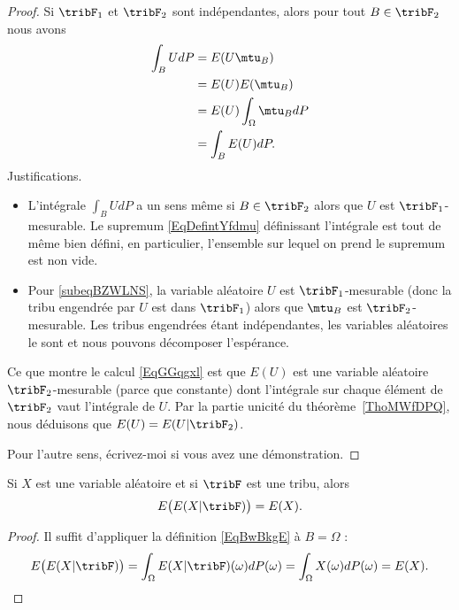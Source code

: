 \begin{proof}
	Si \( \tribF_1\) et \( \tribF_2\) sont indépendantes, alors pour tout \( B\in\tribF_2\) nous avons
	\begin{subequations}    \label{EqGGqgxl}
		\begin{align}
			\int_B UdP & =E(U\mtu_B)                                \\
			           & =E(U)E(\mtu_B)         \label{subeqBZWLNS} \\
			           & =E(U)\int_{\Omega}\mtu_BdP                 \\
			           & =\int_B E(U)dP.
		\end{align}
	\end{subequations}
	Justifications.
	\begin{itemize}
		\item L'intégrale \( \int_BUdP\) a un sens même si \( B\in\tribF_2\) alors que \( U\) est \( \tribF_1\)-mesurable. Le supremum \eqref{EqDefintYfdmu} définissant l'intégrale est tout de même bien défini, en particulier, l'ensemble sur lequel on prend le supremum est non vide.
		\item
		      Pour \eqref{subeqBZWLNS}, la variable aléatoire \( U\) est \( \tribF_1\)-mesurable (donc la tribu engendrée par \( U\) est dans \( \tribF_1\)) alors que \( \mtu_B\) est \( \tribF_2\)-mesurable. Les tribus engendrées étant indépendantes, les variables aléatoires le sont et nous pouvons décomposer l'espérance.
	\end{itemize}
	Ce que montre le calcul \eqref{EqGGqgxl} est que \( E(U)\) est une variable aléatoire \( \tribF_2\)-mesurable (parce que constante) dont l'intégrale sur chaque élément de \( \tribF_2\) vaut l'intégrale de \( U\). Par la partie unicité du théorème~\ref{ThoMWfDPQ}, nous déduisons que \( E(U)=E(U|\tribF_2)\).

	Pour l'autre sens, écrivez-moi si vous avez une démonstration. %
\end{proof}

\begin{corollary}   \label{CorakyvMp}
	Si \( X\) est une variable aléatoire et si \( \tribF\) est une tribu, alors
	\begin{equation}
		E\big( E(X|\tribF) \big)=E(X).
	\end{equation}
\end{corollary}

\begin{proof}
	Il suffit d'appliquer la définition \eqref{EqBwBkgE} à \( B=\Omega\) :
	\begin{equation}
		E\big( E(X|\tribF) \big)=\int_{\Omega}E(X|\tribF)(\omega)dP(\omega)=\int_{\Omega}X(\omega)dP(\omega)=E(X).
	\end{equation}
\end{proof}

